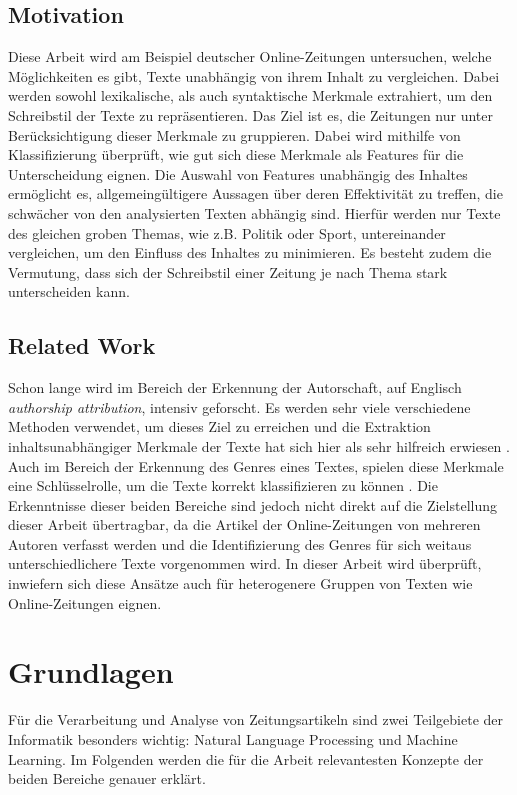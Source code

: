 \section{Motivation}
Diese Arbeit wird am Beispiel deutscher Online-Zeitungen untersuchen, welche Möglichkeiten es gibt, Texte unabhängig von ihrem Inhalt zu vergleichen. Dabei werden sowohl lexikalische, als auch syntaktische Merkmale extrahiert, um den Schreibstil der Texte zu repräsentieren. Das Ziel ist es, die Zeitungen nur unter Berücksichtigung dieser Merkmale zu gruppieren. Dabei wird mithilfe von Klassifizierung überprüft, wie gut sich diese Merkmale als Features für die Unterscheidung eignen. Die Auswahl von Features unabhängig des Inhaltes ermöglicht es, allgemeingültigere Aussagen über deren Effektivität zu treffen, die schwächer von den analysierten Texten abhängig sind. Hierfür werden nur Texte des gleichen groben Themas, wie z.B. Politik oder Sport, untereinander vergleichen, um den Einfluss des Inhaltes zu minimieren. Es besteht zudem die Vermutung, dass sich der Schreibstil einer Zeitung je nach Thema stark unterscheiden kann.

\section{Related Work}
Schon lange wird im Bereich der Erkennung der Autorschaft, auf Englisch \textit{authorship attribution}, intensiv geforscht. Es werden sehr viele verschiedene Methoden verwendet, um dieses Ziel zu erreichen und die Extraktion inhaltsunabhängiger Merkmale der Texte hat sich hier als sehr hilfreich erwiesen \cite{stamatatos2009survey}. Auch im Bereich der Erkennung des Genres eines Textes, spielen diese Merkmale eine Schlüsselrolle, um die Texte korrekt klassifizieren zu können \cite{cimino2017identifying}. Die Erkenntnisse dieser beiden Bereiche sind jedoch nicht direkt auf die Zielstellung dieser Arbeit übertragbar, da die Artikel der Online-Zeitungen von mehreren Autoren verfasst werden und die Identifizierung des Genres für sich weitaus unterschiedlichere Texte vorgenommen wird. In dieser Arbeit wird überprüft, inwiefern sich diese Ansätze auch für heterogenere Gruppen von Texten wie Online-Zeitungen eignen.

\chapter{Grundlagen}
Für die Verarbeitung und Analyse von Zeitungsartikeln sind zwei Teilgebiete der Informatik besonders wichtig: Natural Language Processing und Machine Learning. Im Folgenden werden die für die Arbeit relevantesten Konzepte der beiden Bereiche genauer erklärt.

